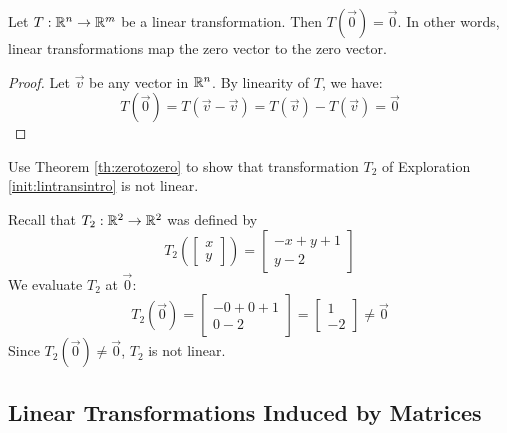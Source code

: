 \documentclass{ximera}
\begin{document}
\begin{theorem}\label{th:zerotozero} Let $T:\mathbb{R}^n\rightarrow \mathbb{R}^m$ be a linear transformation.  Then $T(\vec{0})=\vec{0}$.  In other words, linear transformations map the zero vector to the zero vector.
\end{theorem}
\begin{proof}
Let $\vec{v}$ be any vector in $\mathbb{R}^n$.  By linearity of $T$, we have:
$$T(\vec{0})=T(\vec{v}-\vec{v})=T(\vec{v})-T(\vec{v})=\vec{0}$$
\end{proof}

\begin{example}\label{ex:zerotozero}
Use Theorem \ref{th:zerotozero} to show that transformation $T_2$ of Exploration \ref{init:lintransintro} is not linear.
\begin{explanation}
Recall that $T_2:\mathbb{R}^2\rightarrow\mathbb{R}^2$ was defined by
$$T_2\left(\begin{bmatrix}
x\\
y
\end{bmatrix}\right)=\begin{bmatrix}
-x+y+1\\
y-2
\end{bmatrix}$$
We evaluate $T_2$ at $\vec{0}$:
$$T_2(\vec{0})=\begin{bmatrix}
-0+0+1\\
0-2
\end{bmatrix}=\begin{bmatrix}1\\-2\end{bmatrix}\neq\vec{0}$$
Since $T_2(\vec{0})\neq\vec{0}$, $T_2$ is not linear.
\end{explanation}
\end{example}




\subsection*{Linear Transformations Induced by Matrices}
\end{document}
